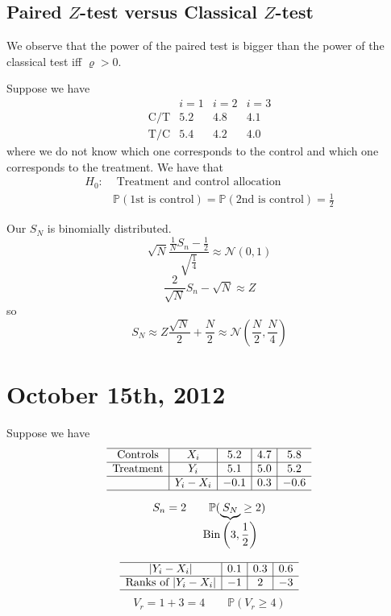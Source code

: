\documentclass[a4paper,12pt]{amsart}
\newcommand{\p}[1]{\mathbb{P}\left(#1\right)}
\begin{document}
\subsection{Paired $Z$-test versus Classical $Z$-test}
We observe that the power of the paired test is bigger than the power of the classical test iff $\varrho>0$.

Suppose we have 
\[\begin{array}{cccc}
& i=1 & i=2 & i=3 \\
\hline
\text{C/T}& 5.2 & 4.8 & 4.1\\
\text{T/C}& 5.4 & 4.2 & 4.0
\end{array} \]
where we do not know which one corresponds to the control and which one corresponds to the treatment. We have that 
\begin{align*}
H_0: & \text{ Treatment and control allocation }\\
& \p{\text{1st is control}} = \p{\text{2nd is control}} = \frac{1}{2}
\end{align*}

Our $S_N$ is binomially distributed.
\[\sqrt{N}\frac{\frac{1}{N}S_n - \frac{1}{2}}{\sqrt{\frac{1}{4}}} \approx \mathcal{N}(0,1)\]
\[\frac{2}{\sqrt{N}}S_n - \sqrt{N} \approx Z\]
so
\[S_N \approx Z \frac{\sqrt{N}}{2} + \frac{N}{2} \approx \mathcal{N}\left(\frac{N}{2}, \frac{N}{4}\right)\]



\section{October 15th, 2012}
Suppose we have
\[\begin{array}{c|c|c|c|c}
\hline
\text{Controls} & X_i & 5.2 & 4.7 & 5.8\\
\hline
\text{Treatment} & Y_i & 5.1 & 5.0 & 5.2\\
\hline
& Y_i - X_i & -0.1 & 0.3 & -0.6\\
\hline
\end{array} \]

\[S_n = 2 \qquad \mathbb{P}(\underbrace{S_N}_{\mathclap{\displaystyle \text{Bin}\left(3,\frac{1}{2}\right)}} \geq 2)\]


\[\begin{array}{c|c|c|c}
\hline
|Y_i - X_i| & 0.1 & 0.3 & 0.6\\
\hline
\text{Ranks of } |Y_i - X_i| & -1 & 2 & -3\\
\hline
\end{array}\]
\[V_r = 1 + 3 = 4 \qquad \p{V_r \geq 4}\]
\end{document}
